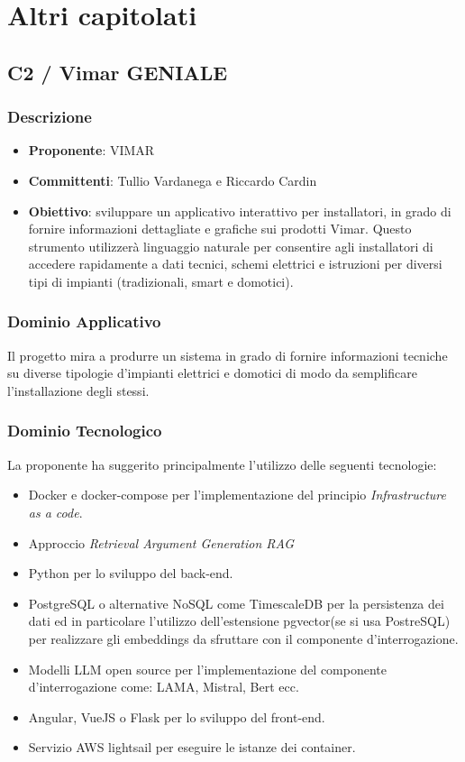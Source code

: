 \documentclass[a4paper, 12pt]{article}
\begin{document}
\section{Altri capitolati}
\subsection{C2 / Vimar GENIALE}

\subsubsection{Descrizione}
\begin{itemize}
    \item \textbf{Proponente}: VIMAR
    \item \textbf{Committenti}: Tullio Vardanega e Riccardo Cardin
    \item \textbf{Obiettivo}: sviluppare un applicativo interattivo per installatori, in grado di fornire informazioni dettagliate e grafiche sui prodotti Vimar. 
    Questo strumento utilizzerà linguaggio naturale per consentire agli installatori di accedere rapidamente a dati tecnici, schemi elettrici e istruzioni per diversi tipi di impianti (tradizionali, smart e domotici).    
\end{itemize}

\subsubsection{Dominio Applicativo}
Il progetto mira a produrre un sistema in grado di fornire informazioni tecniche su diverse tipologie d'impianti elettrici e domotici di modo da semplificare l’installazione degli stessi.

\subsubsection{Dominio Tecnologico}
La proponente ha suggerito principalmente l’utilizzo delle seguenti tecnologie:
\begin{itemize}
    \item Docker e docker-compose per l’implementazione del principio \textit{Infrastructure as a code}.
    \item Approccio\textit{ Retrieval Argument Generation RAG}
    \item Python per lo sviluppo del back-end.
    \item PostgreSQL o alternative NoSQL come TimescaleDB per la persistenza dei dati ed in particolare l’utilizzo dell’estensione pgvector(se si usa PostreSQL) per realizzare gli embeddings da sfruttare con il componente d'interrogazione.
    \item Modelli LLM open source per l’implementazione del componente d'interrogazione come: LAMA, Mistral, Bert ecc.
    \item Angular, VueJS o Flask per lo sviluppo del front-end.
    \item Servizio AWS lightsail per eseguire le istanze dei container.
\end{itemize}
\end{document}
